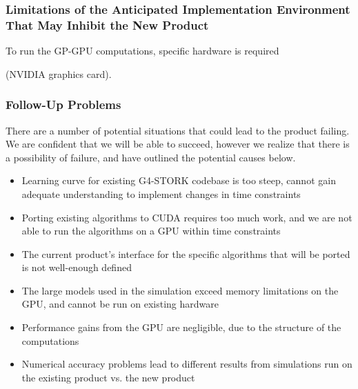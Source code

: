 \documentclass[12pt]{article}
\newcommand{\todo}[1]{\textcolor{red}{[TODO: #1]}} \else
\newcommand{\authornote}[3]{} \newcommand{\todo}[1]{} \fi
\newcommand{\ds}[1]{\authornote{blue}{DS}{#1}} %
\newcommand{\mmp}[1]{\authornote{green}{MP}{#1}}
\begin{document}
\subsubsection{Limitations of the Anticipated Implementation Environment That May Inhibit the New Product}
To run the GP-GPU computations, specific hardware is required
\ds{You should stop here, unless you explained (in the constraints section)
why you need an NVIDIA card. Also, what is ``recent"?}\mmp{I explained why we need an NVIDIA card. did not explain recent. TODO}
(NVIDIA graphics card).

\subsubsection{Follow-Up Problems}
There are a number of potential situations that could lead to the product failing. We are confident that we will be able to succeed, however we realize that there is a possibility of failure, and have outlined the potential causes below.
\begin{itemize}
\item Learning curve for existing G4-STORK codebase is too steep, cannot gain adequate understanding to implement changes in time constraints
\item Porting existing algorithms to CUDA requires too much work, and we are not able to run the algorithms on a GPU within time constraints
\item The current product's interface for the specific algorithms that will be ported is not well-enough defined
\item The large models used in the simulation exceed memory limitations on the GPU, and cannot be run on existing hardware
\item Performance gains from the GPU are negligible, due to the structure of the computations
\item Numerical accuracy problems lead to different results from simulations run on the existing product vs. the new product
\end{itemize}

\end{document}
